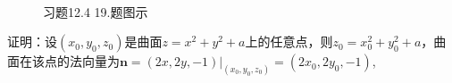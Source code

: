 \documentclass[12pt,UTF8]{ctexart}
\begin{document}
\begin{enumerate}
\begin{figure}[H]
\begin{center}
\\
\end{center}
\caption{习题12.4 19.题图示}
\label{12-4-19}
\end{figure}

证明：设$(x_0,y_0,z_0)$是曲面$z=x^2+y^2+a$上的任意点，则$z_0=x_0^2+y_0^2+a$，曲面在该点的法向量为$\bm n=(2x,2y,-1)\big|_{(x_0,y_0,z_0)}=(2x_0,2y_0,-1)$,


\end{enumerate}
\end{document}
